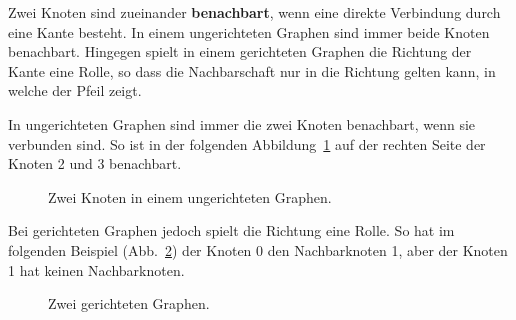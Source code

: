 \begin{mdef}
Zwei Knoten sind zueinander \textbf{benachbart}, wenn eine direkte Verbindung durch eine Kante besteht. 
In einem ungerichteten Graphen sind immer beide Knoten benachbart. 
Hingegen spielt in einem gerichteten Graphen die Richtung der Kante eine Rolle, so dass die Nachbarschaft nur in die Richtung gelten kann, in welche der Pfeil zeigt.

\end{mdef}

\begin{mbsp}
In ungerichteten Graphen sind immer die zwei Knoten benachbart, wenn sie verbunden sind. 
So ist in der folgenden Abbildung~\ref{fig:bsp:unbar} auf der rechten Seite der Knoten 2 und 3 benachbart. 
\begin{figure}[htb]
\begin{center}

\caption{Zwei Knoten in einem ungerichteten Graphen.}
\label{fig:bsp:unbar}
\end{center}
\end{figure}
Bei gerichteten Graphen jedoch spielt die Richtung eine Rolle. So hat im folgenden Beispiel (Abb.~\ref{fig:bsp:gnbar}) der Knoten 0 den Nachbarknoten 1, aber der Knoten 1 hat keinen Nachbarknoten. 
\begin{figure}[htb]
\begin{center}
\caption{Zwei gerichteten Graphen.}
\label{fig:bsp:gnbar}
\end{center}
\end{figure}
\end{mbsp}


